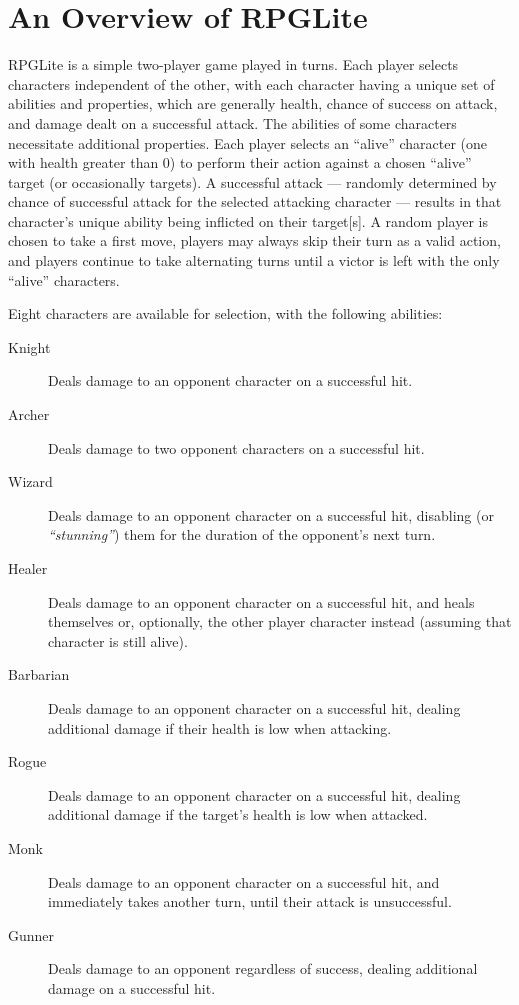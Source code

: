 
\section{An Overview of RPGLite}

RPGLite is a simple two-player game played in turns. Each player selects
characters independent of the other, with each character having a unique set of
abilities and properties, which are generally health, chance of success on
attack, and damage dealt on a successful attack. The abilities of some
characters necessitate additional properties. Each player selects an ``alive''
character (one with health greater than 0) to perform their action against a
chosen ``alive'' target (or occasionally targets). A successful attack ---
randomly determined by chance of successful attack for the selected attacking
character --- results in that character's unique ability being inflicted on
their target[s]. A random player is chosen to take a first move, players may
always skip their turn as a valid action, and players continue to take
alternating turns until a victor is left with the only ``alive'' characters.

Eight characters are available for selection, with the following abilities:

\begin{description}
    \item[Knight] Deals damage to an opponent character on a successful hit.
    \item[Archer] Deals damage to two opponent characters on a successful hit. 
    \item[Wizard] Deals damage to an opponent character on a successful hit,
    disabling (or \emph{``stunning''}) them for the duration of the opponent's
    next turn.
    \item[Healer] Deals damage to an opponent character on a successful hit, and
    heals themselves or, optionally, the other player character instead
    (assuming that character is still alive).
    \item[Barbarian] Deals damage to an opponent character on a successful hit,
    dealing additional damage if their health is low when attacking.
    \item[Rogue] Deals damage to an opponent character on a successful hit,
    dealing additional damage if the target's health is low when attacked.
    \item[Monk] Deals damage to an opponent character on a successful hit, and
    immediately takes another turn, until their attack is unsuccessful.
    \item[Gunner] Deals damage to an opponent regardless of success, dealing
    additional damage on a successful hit.
\end{description}

